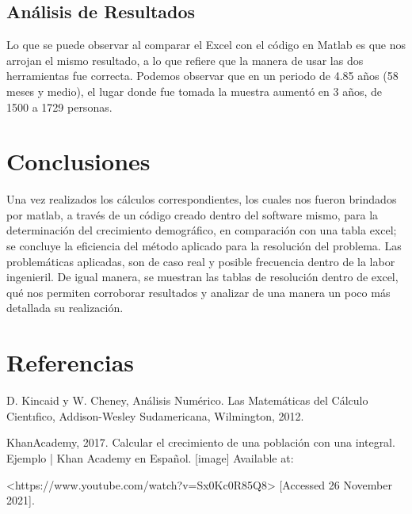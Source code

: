 \documentclass{article}
\begin{document}
\subsection{Análisis de Resultados}
\item Lo que se puede observar al comparar el Excel con el código en Matlab es que nos arrojan el mismo resultado, a lo que refiere que la manera de usar las dos herramientas fue correcta. Podemos observar que en un periodo de 4.85 años (58 meses y medio), el lugar donde fue tomada la muestra aumentó en 3 años, de 1500 a 1729 personas. 

    

\section{Conclusiones}
\item Una vez realizados los cálculos correspondientes, los cuales  nos fueron brindados por matlab, a través de un código creado dentro del software mismo, para la determinación del crecimiento demográfico, en comparación con una tabla excel; se concluye la eficiencia del método aplicado para la resolución del problema. Las problemáticas aplicadas, son de caso real y posible frecuencia dentro de la labor ingenieril.  De igual manera, se muestran las tablas de resolución dentro de excel, qué nos permiten corroborar resultados y analizar de una manera un poco más detallada su realización.


\section{Referencias}
\item D. Kincaid y W. Cheney, Análisis Numérico. Las Matemáticas del Cálculo Cientıfico, Addison-Wesley Sudamericana, Wilmington, 2012.

\item KhanAcademy, 2017. Calcular el crecimiento de una población con una integral. Ejemplo | Khan Academy en Español. [image] Available at: \item <https://www.youtube.com/watch?v=Sx0Kc0R85Q8> [Accessed 26 November 2021].
\end{document}
